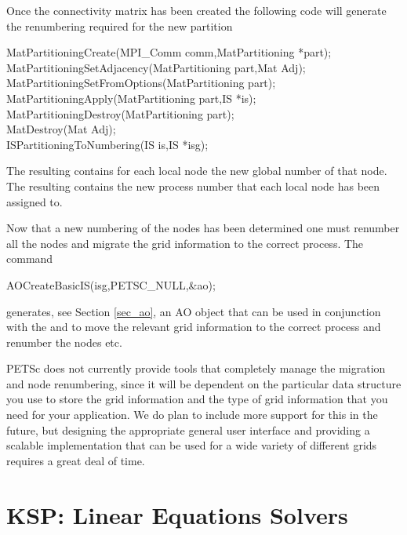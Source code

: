 Once the connectivity matrix has been created the following code will generate the 
renumbering required for the new partition
\begin{tabbing}
 MatPartitioningCreate(MPI\_Comm comm,MatPartitioning *part);\\
 MatPartitioningSetAdjacency(MatPartitioning part,Mat Adj);\\
 MatPartitioningSetFromOptions(MatPartitioning part);\\
 MatPartitioningApply(MatPartitioning part,IS *is);\\
 MatPartitioningDestroy(MatPartitioning part); \\
 MatDestroy(Mat Adj);\\
 ISPartitioningToNumbering(IS is,IS *isg);
\end{tabbing}
The   
  
  resulting  contains for each local node the new global
number of that node. The resulting  contains the new process number
that each local node has been assigned to.

Now that a new numbering of the nodes has been determined one must 
renumber all the nodes and migrate the grid information to the correct process.
The command
\begin{tabbing}
 AOCreateBasicIS(isg,PETSC\_NULL,\&ao);
\end{tabbing}
generates, see Section \ref{sec_ao}, an AO object that can be used in conjunction with the
 and  to move the relevant grid information to the correct process
and renumber the nodes etc. 

PETSc does not currently provide tools that completely manage the migration and 
node renumbering, since it will be dependent on the particular data structure you 
use to store the grid information and the type of grid information that you need
for your application. We do plan to include more support for this in the future,
but designing the appropriate general user interface and providing a scalable
implementation that can be used for a wide variety of different grids requires a
great deal of time.

 


\chapter{KSP: Linear Equations Solvers} 
\label{ch_ksp}

